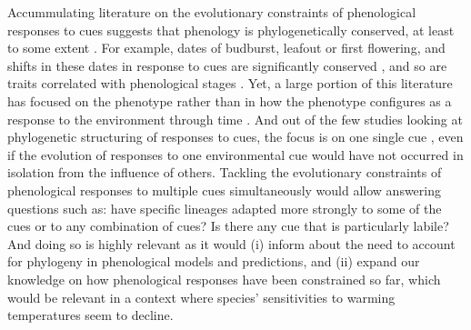 \documentclass{article}\usepackage[]{graphicx}\usepackage[]{color}
\begin{document}
Accummulating literature on the evolutionary constraints of phenological responses to cues suggests that phenology is phylogenetically conserved, at least to some extent \citep{}. For example, dates of budburst, leafout or first flowering, and shifts in these dates in response to cues are significantly conserved \citep{davies2013phylogenetic,joly2019importance}, and so are traits correlated with phenological stages \citep{bolmgren2008time,willis2008phylogenetic}. Yet, a large portion of this literature has focused on the phenotype rather than in how the phenotype configures as a response to the environment through time \citep{}. And out of the few studies looking at phylogenetic structuring of responses to cues, the focus is on one single cue \citep{}, even if the evolution of responses to one environmental cue would have not occurred in isolation from the influence of others. Tackling the evolutionary constraints of phenological responses to multiple cues simultaneously would allow answering questions such as: have specific lineages adapted more strongly to some of the cues or to any combination of cues? Is there any cue that is particularly labile? And doing so is highly relevant as it would (i) inform about the need to account for phylogeny in phenological models and predictions, and (ii) expand our knowledge on how phenological responses have been constrained so far, which would be relevant in a context where species' sensitivities to warming temperatures seem to decline.\\ %
\end{document}
